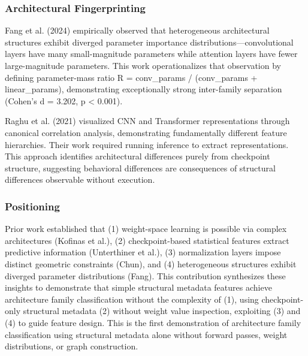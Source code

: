 \subsubsection{Architectural Fingerprinting}

Fang et al. (2024) empirically observed that heterogeneous architectural structures exhibit diverged parameter importance distributions---convolutional layers have many small-magnitude parameters while attention layers have fewer large-magnitude parameters. This work operationalizes that observation by defining parameter-mass ratio R = conv\_params / (conv\_params + linear\_params), demonstrating exceptionally strong inter-family separation (Cohen's d = 3.202, p < 0.001).

Raghu et al. (2021) visualized CNN and Transformer representations through canonical correlation analysis, demonstrating fundamentally different feature hierarchies. Their work required running inference to extract representations. This approach identifies architectural differences purely from checkpoint structure, suggesting behavioral differences are consequences of structural differences observable without execution.

\subsubsection{Positioning}

Prior work established that (1) weight-space learning is possible via complex architectures (Kofinas et al.), (2) checkpoint-based statistical features extract predictive information (Unterthiner et al.), (3) normalization layers impose distinct geometric constraints (Chun), and (4) heterogeneous structures exhibit diverged parameter distributions (Fang). This contribution synthesizes these insights to demonstrate that simple structural metadata features achieve architecture family classification without the complexity of (1), using checkpoint-only structural metadata (2) without weight value inspection, exploiting (3) and (4) to guide feature design. This is the first demonstration of architecture family classification using structural metadata alone without forward passes, weight distributions, or graph construction.
